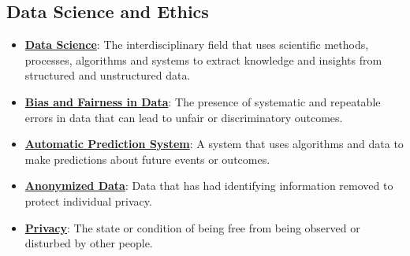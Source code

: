 \documentclass{article}%
\begin{document}
\subsection{Data Science and Ethics}%
\label{subsec:DataScienceandEthics}%
\begin{itemize}[leftmargin=*]%
\item \href{https://purdue.brightspace.com/d2l/common/assets/pdfjs-d2l-dist/1.0.14-legacy/web/viewer.html?file=\%2Fcontent\%2Fenforced\%2F1095467-wl.202510.CS.24300.001\%2F16L2-ethics.pdf\%3Fou\%3D1095467\&lang=en-us\&container=d2l-fileviewer-rendered-pdf\&fullscreen=d2l-fileviewer-rendered-pdf-dialog\&height=667#page=1}{\textbf{Data Science}}: The interdisciplinary field that uses scientific methods, processes, algorithms and systems to extract knowledge and insights from structured and unstructured data.%
\item \href{https://purdue.brightspace.com/d2l/common/assets/pdfjs-d2l-dist/1.0.14-legacy/web/viewer.html?file=\%2Fcontent\%2Fenforced\%2F1095467-wl.202510.CS.24300.001\%2F16L2-ethics.pdf\%3Fou\%3D1095467\&lang=en-us\&container=d2l-fileviewer-rendered-pdf\&fullscreen=d2l-fileviewer-rendered-pdf-dialog\&height=667#page=2}{\textbf{Bias and Fairness in Data}}: The presence of systematic and repeatable errors in data that can lead to unfair or discriminatory outcomes.%
\item \href{https://purdue.brightspace.com/d2l/common/assets/pdfjs-d2l-dist/1.0.14-legacy/web/viewer.html?file=\%2Fcontent\%2Fenforced\%2F1095467-wl.202510.CS.24300.001\%2F16L2-ethics.pdf\%3Fou\%3D1095467\&lang=en-us\&container=d2l-fileviewer-rendered-pdf\&fullscreen=d2l-fileviewer-rendered-pdf-dialog\&height=667#page=4}{\textbf{Automatic Prediction System}}: A system that uses algorithms and data to make predictions about future events or outcomes.%
\item \href{https://purdue.brightspace.com/d2l/common/assets/pdfjs-d2l-dist/1.0.14-legacy/web/viewer.html?file=\%2Fcontent\%2Fenforced\%2F1095467-wl.202510.CS.24300.001\%2F16L2-ethics.pdf\%3Fou\%3D1095467\&lang=en-us\&container=d2l-fileviewer-rendered-pdf\&fullscreen=d2l-fileviewer-rendered-pdf-dialog\&height=667#page=10}{\textbf{Anonymized Data}}: Data that has had identifying information removed to protect individual privacy.%
\item \href{https://purdue.brightspace.com/d2l/common/assets/pdfjs-d2l-dist/1.0.14-legacy/web/viewer.html?file=\%2Fcontent\%2Fenforced\%2F1095467-wl.202510.CS.24300.001\%2F16L2-ethics.pdf\%3Fou\%3D1095467\&lang=en-us\&container=d2l-fileviewer-rendered-pdf\&fullscreen=d2l-fileviewer-rendered-pdf-dialog\&height=667#page=11}{\textbf{Privacy}}: The state or condition of being free from being observed or disturbed by other people.%

\end{itemize}
\end{document}
